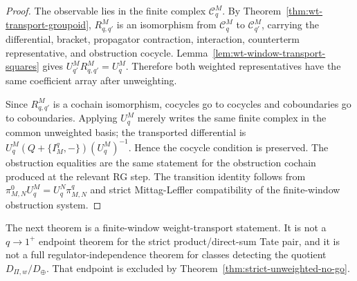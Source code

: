 \begin{proof}
  The observable lies in the finite complex \(\mathcal C^M_q\).  By
  Theorem~\ref{thm:wt-transport-groupoid}, \(R^M_{q,q'}\) is an
  isomorphism from \(\mathcal C^M_q\) to \(\mathcal C^M_{q'}\),
  carrying the differential, bracket, propagator contraction,
  interaction, counterterm representative, and obstruction cocycle.
  Lemma~\ref{lem:wt-window-transport-squares} gives
  \(U^M_{q'}R^M_{q,q'}=U^M_q\).  Therefore both weighted
  representatives have the same coefficient array after unweighting.

  Since \(R^M_{q,q'}\) is a cochain isomorphism, cocycles go to
  cocycles and coboundaries go to coboundaries.  Applying \(U^M_q\)
  merely writes the same finite complex in the common unweighted basis;
  the transported differential is
  \(U^M_q(Q+\{I^q_M,-\})(U^M_q)^{-1}\).  Hence the cocycle condition is
  preserved.  The obstruction equalities are the same statement for
  the obstruction cochain produced at the relevant RG step.  The
  transition identity follows from
  \(\pi^0_{M,N}U^M_q=U^N_q\pi^q_{M,N}\) and strict
  Mittag-Leffler compatibility of the finite-window obstruction system.
\end{proof}

The next theorem is a finite-window weight-transport statement.  It is
not a \(q\to1^+\) endpoint theorem for the strict product/direct-sum
Tate pair, and it is not a full regulator-independence theorem for
classes detecting the quotient \(D_{\Pi,w}/D_{\oplus}\).  That endpoint
is excluded by Theorem~\ref{thm:strict-unweighted-no-go}.

